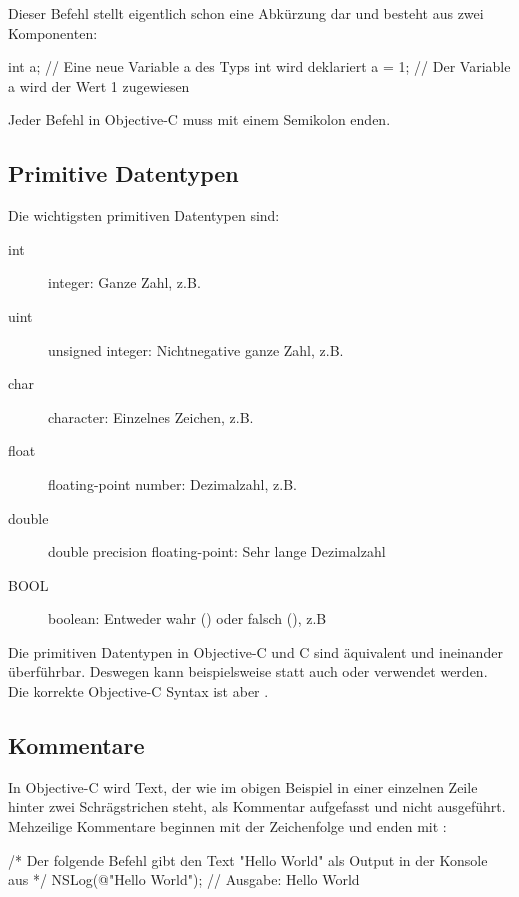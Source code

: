 \documentclass[parskip=half, final]{scrreprt}
\begin{document}
Dieser Befehl stellt eigentlich schon eine Abkürzung dar und besteht aus zwei Komponenten:
\begin{objclst}
int a; // Eine neue Variable a des Typs int wird deklariert
a = 1; // Der Variable a wird der Wert 1 zugewiesen
\end{objclst}

Jeder Befehl in Objective-C muss mit einem Semikolon enden.

\subsection{Primitive Datentypen}

Die wichtigsten primitiven Datentypen sind:

\begin{description}
\item[int] integer: Ganze Zahl, z.B. 
\item[uint] unsigned integer: Nichtnegative ganze Zahl, z.B. 
\item[char] character: Einzelnes Zeichen, z.B. 
\item[float] floating-point number: Dezimalzahl, z.B. 
\item[double] double precision floating-point: Sehr lange Dezimalzahl
\item[BOOL] boolean: Entweder wahr () oder falsch (), z.B 
\end{description}

Die primitiven Datentypen in Objective-C und C sind äquivalent und ineinander überführbar. Deswegen kann beispielsweise statt  auch  oder  verwendet werden. Die korrekte Objective-C Syntax ist aber .

\subsection{Kommentare}

In Objective-C wird Text, der wie im obigen Beispiel in einer einzelnen Zeile hinter zwei Schrägstrichen steht, als Kommentar aufgefasst und nicht ausgeführt.
Mehzeilige Kommentare beginnen mit der Zeichenfolge \objc{/*} und enden mit \objc{*/}:
\begin{objclst}
/* Der folgende Befehl
gibt den Text "Hello World"
als Output in der Konsole aus */
NSLog(@"Hello World");
// Ausgabe: Hello World
\end{objclst}
\end{document}
